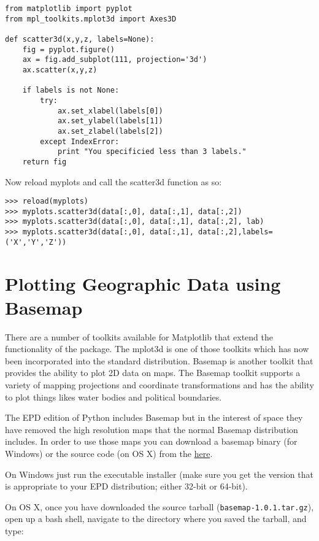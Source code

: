 \documentclass{article}
\begin{document}
\begin{lstlisting}
from matplotlib import pyplot
from mpl_toolkits.mplot3d import Axes3D

def scatter3d(x,y,z, labels=None):
    fig = pyplot.figure()
    ax = fig.add_subplot(111, projection='3d')
    ax.scatter(x,y,z)

    if labels is not None:
        try:
            ax.set_xlabel(labels[0])
            ax.set_ylabel(labels[1])
            ax.set_zlabel(labels[2])
        except IndexError:
            print "You specificied less than 3 labels."
    return fig
\end{lstlisting}
Now reload myplots and call the scatter3d function as so:

\begin{lstlisting}
>>> reload(myplots)
>>> myplots.scatter3d(data[:,0], data[:,1], data[:,2])
>>> myplots.scatter3d(data[:,0], data[:,1], data[:,2], lab)
>>> myplots.scatter3d(data[:,0], data[:,1], data[:,2],labels=('X','Y','Z'))
\end{lstlisting}
\section{Plotting Geographic Data using Basemap}

There are a number of toolkits available for Matplotlib that extend the
functionality of the package. The mplot3d is one of those toolkits which
has now been incorporated into the standard distribution. Basemap is
another toolkit that provides the ability to plot 2D data on maps. The
Basemap toolkit supports a variety of mapping projections and coordinate
transformations and has the ability to plot things likes water bodies
and political boundaries.

The EPD edition of Python includes Basemap but in the interest of space
they have removed the high resolution maps that the normal Basemap
distribution includes. In order to use those maps you can download a
basemap binary (for Windows) or the source code (on OS X) from the
\href{http://sourceforge.net/projects/matplotlib/files/matplotlib-toolkits/basemap-1.0.1/}{here}.

On Windows just run the executable installer (make sure you get the
version that is appropriate to your EPD distribution; either 32-bit or
64-bit).

On OS X, once you have downloaded the source tarball
(\lstinline!basemap-1.0.1.tar.gz!), open up a bash shell, navigate to
the directory where you saved the tarball, and type:
\end{document}
